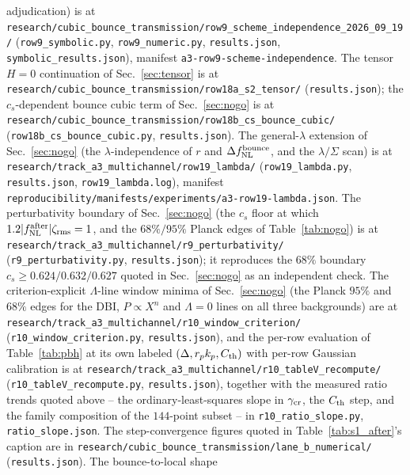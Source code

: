 \documentclass[aps,prd,twocolumn,superscriptaddress,nofootinbib,longbibliography]{revtex4-2}
\newcommand{\fnl}{f_{\rm NL}}
\begin{document}
adjudication) is at
\texttt{research/cubic\_bounce\_transmission/}\allowbreak\texttt{row9\_scheme\_independence\_2026\_09\_19/}
(\texttt{row9\_symbolic.py}, \texttt{row9\_numeric.py}, \texttt{results.json},
\texttt{symbolic\_results.json}), manifest
\texttt{a3-row9-scheme-independence}. The tensor $H=0$
continuation of Sec.~\ref{sec:tensor} is at
\texttt{research/cubic\_bounce\_transmission/}\allowbreak\texttt{row18a\_s2\_tensor/}
(\texttt{results.json}); the $c_s$-dependent bounce cubic term of
Sec.~\ref{sec:nogo} is at
\texttt{research/cubic\_bounce\_transmission/}\allowbreak\texttt{row18b\_cs\_bounce\_cubic/}
(\texttt{row18b\_cs\_bounce\_cubic.py}, \texttt{results.json}). The
general-$\lambda$ extension of Sec.~\ref{sec:nogo}
(the $\lambda$-independence of $r$ and $\Delta\fnl^{\rm bounce}$, and the
$\lambda/\Sigma$ scan) is at
\texttt{research/track\_a3\_multichannel/}\allowbreak\texttt{row19\_lambda/}
(\texttt{row19\_lambda.py}, \texttt{results.json},
\texttt{row19\_lambda.log}), manifest
\texttt{reproducibility/manifests/}\allowbreak\texttt{experiments/}\allowbreak\texttt{a3-row19-lambda.json}. The perturbativity boundary of
Sec.~\ref{sec:nogo} (the $c_s$ floor at which
$1.2|\fnl^{\rm after}|\zeta_{\rm rms}=1$, and the $68\%/95\%$ Planck edges
of Table~\ref{tab:nogo}) is at
\texttt{research/track\_a3\_multichannel/}\allowbreak\texttt{r9\_perturbativity/}
(\texttt{r9\_perturbativity.py}, \texttt{results.json}); it reproduces the $68\%$ boundary
$c_s\ge0.624/0.632/0.627$ quoted in Sec.~\ref{sec:nogo} as an independent
check. The criterion-explicit $\Lambda$-line window minima of
Sec.~\ref{sec:nogo} (the Planck $95\%$ and $68\%$ edges for the DBI,
$P\propto X^n$ and $\Lambda=0$ lines on all three backgrounds) are at
\texttt{research/track\_a3\_multichannel/}\allowbreak\texttt{r10\_window\_criterion/}
(\texttt{r10\_window\_criterion.py}, \texttt{results.json}), and the
per-row evaluation of Table~\ref{tab:pbh} at its own labeled
$(\Delta,r_pk_p,C_{\rm th})$ with per-row Gaussian calibration is at
\texttt{research/track\_a3\_multichannel/}\allowbreak\texttt{r10\_tableV\_recompute/}
(\texttt{r10\_tableV\_recompute.py}, \texttt{results.json}), together with the
measured ratio trends quoted above -- the ordinary-least-squares slope in
$\gamma_{\rm cr}$, the $C_{\rm th}$ step, and the family composition of the
$144$-point subset -- in \texttt{r10\_ratio\_slope.py}, \texttt{ratio\_slope.json}. The step-convergence figures quoted in
Table~\ref{tab:s1_after}'s caption are in
\texttt{research/cubic\_bounce\_transmission/}\allowbreak\texttt{lane\_b\_numerical/}
(\texttt{results.json}). The bounce-to-local shape
\end{document}
